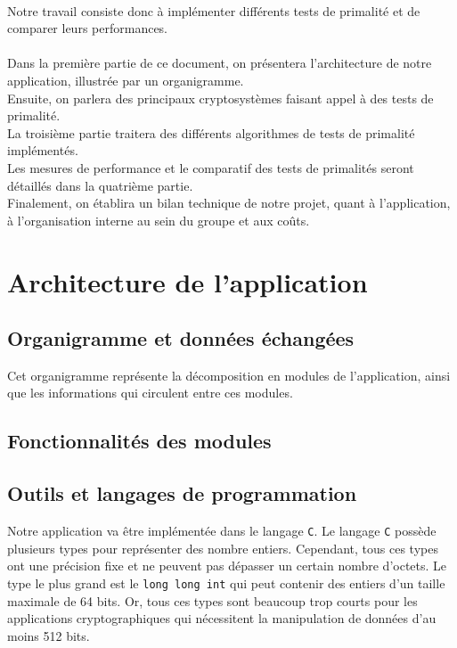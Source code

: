 	\paragraph{}Notre travail consiste donc à implémenter différents tests de primalité et de comparer leurs performances.
	\paragraph{}Dans la première partie de ce document, on présentera l'architecture de notre application, illustrée par un organigramme.\\
	Ensuite, on parlera des principaux cryptosystèmes faisant appel à des tests de primalité. \\
	La troisième partie traitera des différents algorithmes de tests de primalité implémentés.\\
	Les mesures de performance et le comparatif des tests de primalités seront détaillés dans la quatrième partie.\\
	Finalement, on établira un bilan technique de notre projet, quant à l'application, à l'organisation interne au sein du groupe et aux coûts.
	
	\section{Architecture de l'application}
		\subsection{Organigramme et données échangées}
		Cet organigramme représente la décomposition en modules de l'application, ainsi que les informations qui circulent entre ces modules.
		
		\subsection{Fonctionnalités des modules}
		
		\subsection{Outils et langages de programmation}
		Notre application va être implémentée dans le langage \lstinline!C!. Le langage \lstinline!C! possède plusieurs types pour représenter des nombre entiers. Cependant, tous ces types ont une précision fixe et ne peuvent pas dépasser un certain nombre d'octets. Le type le plus grand est le \lstinline!long long int! qui peut contenir des entiers d'un taille maximale de 64 bits. Or, tous ces types sont beaucoup trop courts pour les applications cryptographiques qui nécessitent la manipulation de données d'au moins 512 bits.

